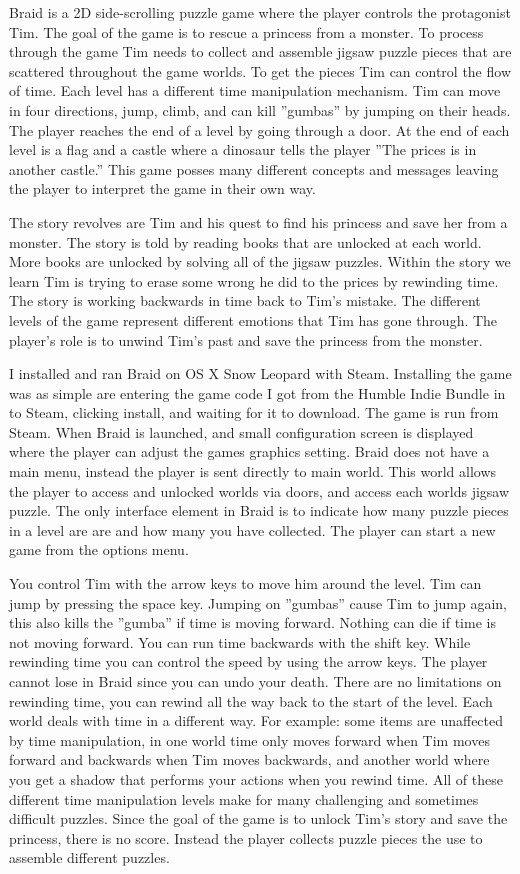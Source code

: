 \documentclass[a4paper,12pt]{report}
\begin{document}
Braid is a 2D side-scrolling puzzle game where the player controls the protagonist Tim.  The goal of the game is to rescue a princess from a monster.  To process through the game Tim needs to collect and assemble jigsaw puzzle pieces that are scattered throughout the game worlds.  To get the pieces Tim can control the flow of time.  Each level has a different time manipulation mechanism.  Tim can move in four directions, jump, climb, and can kill ''gumbas'' by jumping on their heads.  The player reaches the end of a level by going through a door.  At the end of each level is a flag and a castle where a dinosaur tells the player ''The prices is in another castle.''  This game posses many different concepts and messages leaving the player to interpret the game in their own way.


The story revolves are Tim and his quest to find his princess and save her from a monster.  The story is told by reading books that are unlocked at each world.  More books are unlocked by solving all of the jigsaw puzzles.  Within the story we learn Tim is trying to erase some wrong he did to the prices by rewinding time.  The story is working backwards in time back to Tim's mistake.  The different levels of the game represent different emotions that Tim has gone through.  The player's role is to unwind Tim's past and save the princess from the monster.

I installed and ran Braid on OS X Snow Leopard with Steam.  Installing the game was as simple are entering the game code I got from the Humble Indie Bundle in to Steam, clicking install, and waiting for it to download.  The game is run from Steam.  When Braid is launched, and small configuration screen is displayed where the player can adjust the games graphics setting.  Braid does not have a main menu, instead the player is sent directly to main world.  This world allows the player to access and unlocked worlds via doors, and access each worlds jigsaw puzzle.  The only interface element in Braid is to indicate how many puzzle pieces in a level are are and how many you have collected.  The player can start a new game from the options menu.

You control Tim with the arrow keys to move him around the level.  Tim can jump by pressing the space key.  Jumping on ''gumbas'' cause Tim to jump again, this also kills the ''gumba'' if time is moving forward.  Nothing can die if time is not moving forward.  You can run time backwards with the shift key.  While rewinding time you can control the speed by using the arrow keys.  The player cannot lose in Braid since you can undo your death.  There are no limitations on rewinding time, you can rewind all the way back to the start of the level.  Each world deals with time in a different way.  For example: some items are unaffected by time manipulation, in one world time only moves forward when Tim moves forward and backwards when Tim moves backwards, and another world where you get a shadow that performs your actions when you rewind time.  All of these different time manipulation levels make for many challenging and sometimes difficult puzzles.  Since the goal of the game is to unlock Tim's story and save the princess, there is no score.  Instead the player collects puzzle pieces the use to assemble different puzzles.
\end{document}
